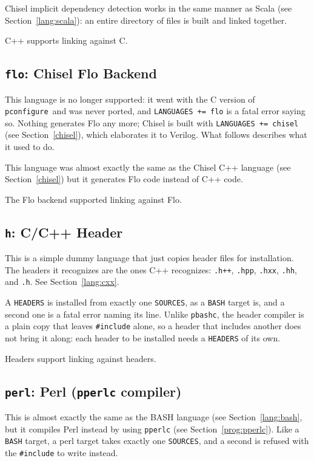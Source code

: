\documentclass{article}
\newcommand{\pconfigure}{\texttt{pconfigure}}
\begin{document}
Chisel implicit dependency detection works in the same manner as Scala
(see Section~\ref{lang:scala}): an entire directory of files is built
and linked together.

C++ supports linking against C.

\subsection{\texttt{flo}: Chisel Flo Backend}

This language is no longer supported: it went with the C version of
\pconfigure\ and was never ported, and \texttt{LANGUAGES += flo} is a
fatal error saying so.  Nothing generates Flo any more; Chisel is built
with \texttt{LANGUAGES += chisel} (see Section~\ref{chisel}), which
elaborates it to Verilog.  What follows describes what it used to do.

This language was almost exactly the same as the Chisel C++ language
(see Section~\ref{chisel}) but it generates Flo code instead of C++
code.

The Flo backend supported linking against Flo.

\subsection{\texttt{h}: C/C++ Header}

This is a simple dummy language that just copies header files for
installation.  The headers it recognizes are the ones C++ recognizes:
\texttt{.h++}, \texttt{.hpp}, \texttt{.hxx}, \texttt{.hh}, and
\texttt{.h}.  See Section~\ref{lang:cxx}.

A \texttt{HEADERS} is installed from exactly one \texttt{SOURCES}, as
a \texttt{BASH} target is, and a second one is a fatal error naming
its line.  Unlike \texttt{pbashc}, the header compiler is a plain copy
that leaves \texttt{\#include} alone, so a header that includes
another does not bring it along: each header to be installed needs a
\texttt{HEADERS} of its own.

Headers support linking against headers.

\subsection{\texttt{perl}: Perl (\texttt{pperlc} compiler)}

This is almost exactly the same as the BASH language (see
Section~\ref{lang:bash}, but it compiles Perl instead by using
\texttt{pperlc} (see Section~\ref{prog:pperlc}).
Like a \texttt{BASH} target, a perl target takes exactly one
\texttt{SOURCES}, and a second is refused with the \texttt{\#include}
to write instead.
\end{document}
